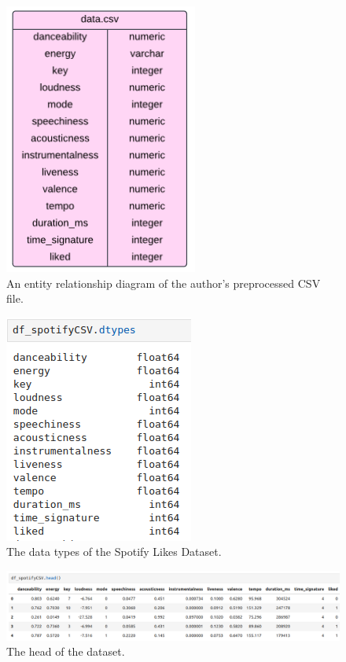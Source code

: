 \documentclass[12pt]{report}
\begin{document}
\begin{figure}[H]
    \centering
    \includegraphics[width=.5\linewidth]{Spotify-ERD.png}
    \caption{An entity relationship diagram of the author's preprocessed CSV file.}
    \label{fig:Spotify-ERD}
\end{figure}

\begin{figure}[H]
    \centering
    \includegraphics[width=.4\linewidth]{pandas/Spotify-DTypes.png}
    \caption{The data types of the Spotify Likes Dataset.}
    \label{fig:Spotify-DTypes}
\end{figure}

\begin{figure}[H]
    \centering
    \includegraphics[width=\linewidth]{pandas/Spotify-Head.png}
    \caption{The head of the dataset.}
    \label{fig:Spotify-Head}
\end{figure}
\end{document}
